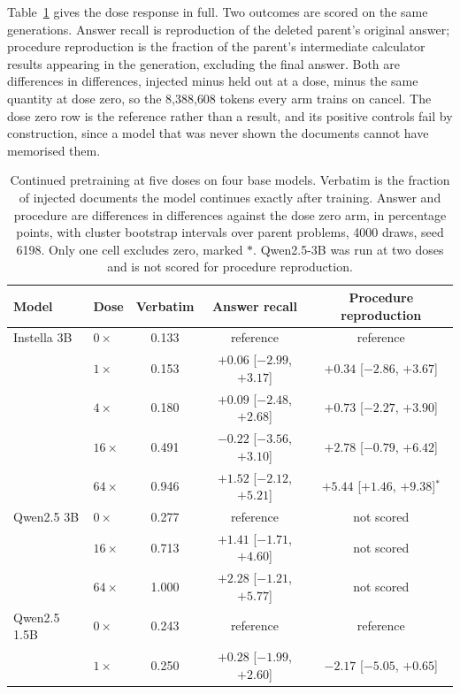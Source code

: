 \documentclass{article}
\begin{document}
Table~\ref{tab:dose} gives the dose response in full. Two outcomes are scored on the same
generations. Answer recall is reproduction of the deleted parent's original answer;
procedure reproduction is the fraction of the parent's intermediate calculator results
appearing in the generation, excluding the final answer. Both are differences in
differences, injected minus held out at a dose, minus the same quantity at dose zero, so the
8{,}388{,}608 tokens every arm trains on cancel. The dose zero row is the reference rather
than a result, and its positive controls fail by construction, since a model that was never
shown the documents cannot have memorised them.

\begin{table}[h]
\centering
\caption{Continued pretraining at five doses on four base models. Verbatim is the fraction
of injected documents the model continues exactly after training. Answer and procedure are
differences in differences against the dose zero arm, in percentage points, with cluster
bootstrap intervals over parent problems, 4000 draws, seed 6198. Only one cell excludes
zero, marked $\ast$. Qwen2.5-3B was run at two doses and is not scored for procedure
reproduction.}
\label{tab:dose}
\small
\begin{tabular}{llccc}
\toprule
Model & Dose & Verbatim & Answer recall & Procedure reproduction \\
\midrule
Instella 3B & $0\times$ & 0.133 & reference & reference \\
            & $1\times$ & 0.153 & $+0.06$ [$-2.99$, $+3.17$] & $+0.34$ [$-2.86$, $+3.67$] \\
            & $4\times$ & 0.180 & $+0.09$ [$-2.48$, $+2.68$] & $+0.73$ [$-2.27$, $+3.90$] \\
            & $16\times$ & 0.491 & $-0.22$ [$-3.56$, $+3.10$] & $+2.78$ [$-0.79$, $+6.42$] \\
            & $64\times$ & 0.946 & $+1.52$ [$-2.12$, $+5.21$] & $\mathbf{+5.44}$ [$+1.46$, $+9.38$]$^\ast$ \\
\midrule
Qwen2.5 3B  & $0\times$ & 0.277 & reference & not scored \\
            & $16\times$ & 0.713 & $+1.41$ [$-1.71$, $+4.60$] & not scored \\
            & $64\times$ & 1.000 & $+2.28$ [$-1.21$, $+5.77$] & not scored \\
\midrule
Qwen2.5 1.5B & $0\times$ & 0.243 & reference & reference \\
            & $1\times$ & 0.250 & $+0.28$ [$-1.99$, $+2.60$] & $-2.17$ [$-5.05$, $+0.65$] \\

\end{tabular}
\end{table}
\end{document}
